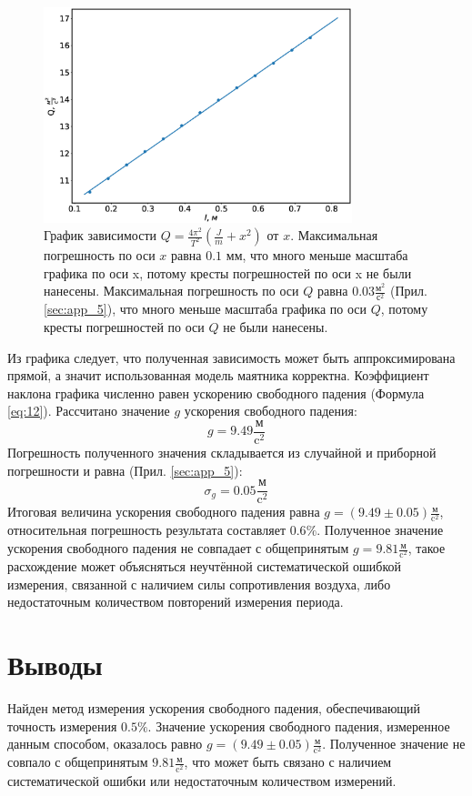 \documentclass[12pt]{article}
\begin{document}
\begin{figure}[H]
    \begin{center}
        \includegraphics[width=0.8\textwidth]{gr1.eps}
    \end{center}
    \caption{График зависимости $Q = \frac{4\pi^2}{T^2}(\frac{J}{m} + x^2)$ от $x$. Максимальная погрешность по оси $x$ равна 
    $0.1 \textrm{ мм}$, что много меньше масштаба графика по оси x, потому кресты погрешностей по оси x не были нанесены. Максимальная погрешность по
    оси $Q$ равна $0.03 \frac{\textrm{м}^2}{\textrm{с}^2}$ (Прил. \ref{sec:app_5}), что много меньше масштаба графика по оси $Q$, потому кресты
    погрешностей по оси $Q$ не были нанесены.}
    \label{fig:3}
\end{figure}
Из графика следует, что полученная зависимость может быть аппроксимирована прямой, а значит использованная модель маятника корректна.
Коэффициент наклона графика численно равен ускорению свободного падения (Формула \ref{eq:12}). Рассчитано значение $g$ ускорения свободного
падения:
$$g = 9.49 \frac{\textrm{м}}{\textrm{c}^2}$$
Погрешность полученного значения складывается из случайной и приборной погрешности и равна (Прил. \ref{sec:app_5}):
$$\sigma_g = 0.05 \frac{\textrm{м}}{\textrm{c}^2}$$
Итоговая величина ускорения свободного падения равна $g = (9.49 \pm 0.05) \frac{\textrm{м}}{\textrm{c}^2}$, относительная погрешность результата
составляет $0.6\%$.
Полученное значение ускорения свободного падения не совпадает с общепринятым $g = 9.81 \frac{\textrm{м}}{\textrm{c}^2}$,
такое расхождение может объясняться неучтённой систематической ошибкой измерения, связанной с наличием силы сопротивления воздуха, либо
недостаточным количеством повторений измерения периода.

\section{Выводы}
Найден метод измерения ускорения свободного падения, обеспечивающий точность измерения $0.5\%$. Значение ускорения свободного падения,
измеренное данным способом, оказалось равно $g = (9.49 \pm 0.05) \frac{\textrm{м}}{\textrm{c}^2}$. Полученное значение не совпало с 
общепринятым $9.81 \frac{\textrm{м}}{\textrm{c}^2}$, что может быть связано с наличием систематической ошибки или недостаточным количеством
измерений.
\end{document}
